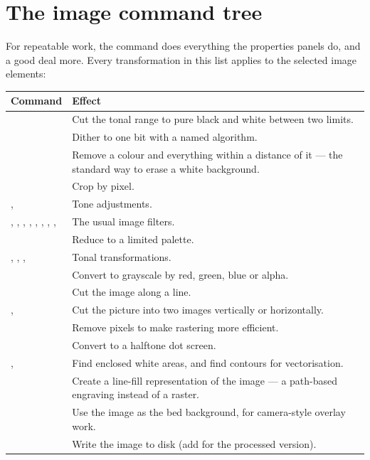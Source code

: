 \section{The image command tree}

For repeatable work, the  command does everything the properties
panels do, and a good deal more. Every transformation in this list applies to the
selected image elements:

\begin{center}\small
\begin{tabular}{@{}L{4.4cm}L{9.8cm}@{}}
\toprule
\textbf{Command} & \textbf{Effect} \\
\midrule
{} & Cut the tonal range to pure black and white
between two limits. \\
 & Dither to one bit with a named algorithm. \\
 & Remove a colour and everything within a
distance of it --- the standard way to erase a white background. \\
 & Crop by pixel. \\
,  & Tone adjustments. \\
, , , ,
, , , ,  &
The usual image filters. \\
 & Reduce to a limited palette. \\
, , ,  & Tonal transformations. \\
 & Convert to grayscale by red, green, blue or
alpha. \\
 & Cut the image along a line. \\
,  & Cut the picture into two images vertically or
horizontally. \\
 & Remove pixels to make rastering more
efficient. \\
 & Convert to a halftone dot screen. \\
,  & Find enclosed white areas, and find
contours for vectorisation. \\
 & Create a line-fill representation of the image --- a path-based
engraving instead of a raster. \\
 & Use the image as the bed background, for camera-style
overlay work. \\
 & Write the image to disk (add  for the
processed version). \\
\bottomrule
\end{tabular}
\end{center}

